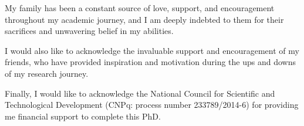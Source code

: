 My family has been a constant source of love, support, and encouragement throughout my academic journey, and I am deeply indebted to them for their sacrifices and unwavering belief in my abilities.

I would also like to acknowledge the invaluable support and encouragement of my friends, who have provided inspiration and motivation during the ups and downs of my research journey.

Finally, I would like to acknowledge the National Council for Scientific and Technological Development (CNPq: process number 233789/2014-6) for providing me financial support to complete this PhD.

